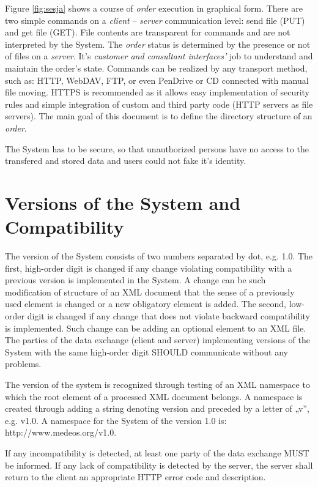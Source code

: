 \documentclass[a4paper]{article}
\begin{document}
Figure \ref{fig:sesja} shows a course of \emph{order} execution in graphical form.
There are two simple commands on a \emph{client} -- \emph{server} communication level:
send file (PUT) and get file (GET). File contents are transparent for commands and are not
interpreted by the System. The \emph{order} status is determined by the presence or
not of files on a \emph{server}. It's \emph{customer and consultant interfaces'} job
to understand and maintain the order's state. Commands can be realized by any transport
method, such as: HTTP, WebDAV, FTP, or even PenDrive or CD connected with manual file
moving. HTTPS is recommended as it allows easy implementation of security rules and simple
integration of custom and third party code (HTTP servers as file servers). The
main goal of this document is to define the directory structure of an \emph{order}.

The System has to be secure, so that unauthorized persons have no access to the
transfered and stored data and users could not fake it's identity. 

\section{Versions of the System and Compatibility}
The version of the System consists of two numbers separated by dot, e.g. 1.0. The first, 
high-order digit is changed if any change violating compatibility with a previous version 
is implemented in the System. A change can be such modification of structure of an XML document
that the sense of a previously used element is changed or a new obligatory element is added. 
The second, low-order digit is changed if any change that does not violate backward 
compatibility is implemented. Such change can be adding an optional element to an XML file. 
The parties of the data exchange (client and server) implementing versions of the System with 
the same high-order digit SHOULD communicate without any problems.

The version of the system is recognized through testing of an XML namespace to which the root 
element of a processed XML document belongs. A namespace is created through adding a string 
denoting version and preceded by a letter of „v”, e.g. v1.0. A namespace for the System of 
the version 1.0 is: http://www.medeos.org/v1.0.

If any incompatibility is detected, at least one party of the data exchange MUST be informed. 
If any lack of compatibility is detected by the server, the server shall return to the client 
an appropriate HTTP error code and description.
\end{document}
